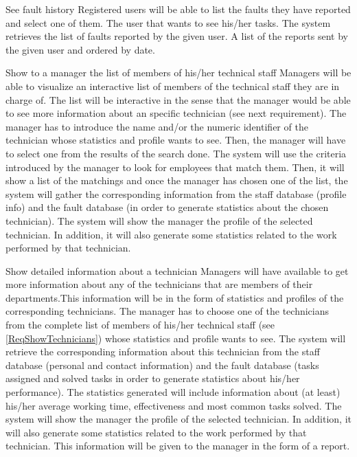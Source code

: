 \begin{requirement}{See fault history}
\reqdesc Registered users will be able to list the faults they have reported and select one of them.
\reqin The user that wants to see his/her tasks.
\reqsteps The system retrieves the list of faults reported by the given user.
\reqout A list of the reports sent by the given user and ordered by date.
\end{requirement}

\begin{requirement}{Show to a manager the list of members of his/her technical staff}\label{ReqShowTechnicians}
\reqdesc Managers will be able to visualize an interactive list of members of the technical staff they are in charge of. The list will be interactive in the sense that the manager would be able to see more information about an specific technician (see next requirement).
\reqin The manager has to introduce the name and/or the numeric identifier of the technician whose statistics and profile wants to see. Then, the manager will have to select one from the results of the search done.
\reqsteps The system will use the criteria introduced by the manager to look for employees that match them. Then, it will show a list of the matchings and once the manager has chosen one of the list, the system will gather the corresponding information from the staff database (profile info) and the fault database (in order to generate statistics about the chosen technician).
\reqout The system will show the manager the profile of the selected technician. In addition, it will also generate some statistics related to the work performed by that technician.
\end{requirement}

\begin{requirement}{Show detailed information about a technician}
\reqdesc Managers will have available to get more information about any of the technicians that are members of their departments.This information will be in the form of statistics and profiles of the corresponding technicians.
\reqin The manager has to choose one of the technicians from the complete list of members of his/her technical staff (see \ref{ReqShowTechnicians}) whose statistics and profile wants to see.
\reqsteps The system will retrieve the corresponding information about this technician from the staff database (personal and contact information) and the fault database (tasks assigned and solved tasks in order to generate statistics about his/her performance). The statistics generated will include information about (at least) his/her average working time, effectiveness and most common tasks solved.
\reqout The system will show the manager the profile of the selected technician. In addition, it will also generate some statistics related to the work performed by that technician. This information will be given to the manager in the form of a report.
\end{requirement}


